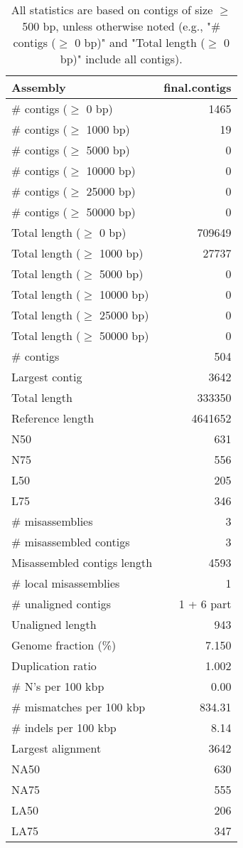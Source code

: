 \documentclass[12pt,a4paper]{article}
\begin{document}
\begin{table}[ht]
\begin{center}
\caption{All statistics are based on contigs of size $\geq$ 500 bp, unless otherwise noted (e.g., "\# contigs ($\geq$ 0 bp)" and "Total length ($\geq$ 0 bp)" include all contigs).}
\begin{tabular}{|l*{1}{|r}|}
\hline
Assembly & final.contigs \\ \hline
\# contigs ($\geq$ 0 bp) & 1465 \\ \hline
\# contigs ($\geq$ 1000 bp) & 19 \\ \hline
\# contigs ($\geq$ 5000 bp) & 0 \\ \hline
\# contigs ($\geq$ 10000 bp) & 0 \\ \hline
\# contigs ($\geq$ 25000 bp) & 0 \\ \hline
\# contigs ($\geq$ 50000 bp) & 0 \\ \hline
Total length ($\geq$ 0 bp) & 709649 \\ \hline
Total length ($\geq$ 1000 bp) & 27737 \\ \hline
Total length ($\geq$ 5000 bp) & 0 \\ \hline
Total length ($\geq$ 10000 bp) & 0 \\ \hline
Total length ($\geq$ 25000 bp) & 0 \\ \hline
Total length ($\geq$ 50000 bp) & 0 \\ \hline
\# contigs & 504 \\ \hline
Largest contig & 3642 \\ \hline
Total length & 333350 \\ \hline
Reference length & 4641652 \\ \hline
N50 & 631 \\ \hline
N75 & 556 \\ \hline
L50 & 205 \\ \hline
L75 & 346 \\ \hline
\# misassemblies & 3 \\ \hline
\# misassembled contigs & 3 \\ \hline
Misassembled contigs length & 4593 \\ \hline
\# local misassemblies & 1 \\ \hline
\# unaligned contigs & 1 + 6 part \\ \hline
Unaligned length & 943 \\ \hline
Genome fraction (\%) & 7.150 \\ \hline
Duplication ratio & 1.002 \\ \hline
\# N's per 100 kbp & 0.00 \\ \hline
\# mismatches per 100 kbp & 834.31 \\ \hline
\# indels per 100 kbp & 8.14 \\ \hline
Largest alignment & 3642 \\ \hline
NA50 & 630 \\ \hline
NA75 & 555 \\ \hline
LA50 & 206 \\ \hline
LA75 & 347 \\ \hline
\end{tabular}
\end{center}
\end{table}
\end{document}
